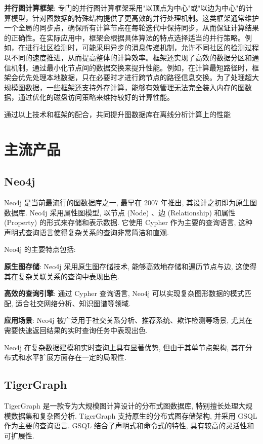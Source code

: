 \documentclass[12pt,hyperref,a4paper,UTF8]{ctexart}
\begin{document}
\textbf{并行图计算框架}: 专门的并行图计算框架采用"以顶点为中心"或"以边为中心"的计算模型，针对图数据的特殊结构提供了更高效的并行处理机制。这类框架通常维护一个全局的同步点，确保所有计算节点在每轮迭代中保持同步，从而保证计算结果的正确性。在实际应用中，框架会根据具体算法的特点选择适当的并行策略。例如，在进行社区检测时，可能采用异步的消息传递机制，允许不同社区的检测过程以不同的速度推进，从而提高整体的计算效率。框架还实现了高效的数据分区和通信机制，通过最小化节点间的数据交换来提升性能。例如，在计算最短路径时，框架会优先处理本地数据，只在必要时才进行跨节点的路径信息交换。为了处理超大规模图数据，一些框架还支持外存计算，能够有效管理无法完全装入内存的图数据，通过优化的磁盘访问策略来维持较好的计算性能。

通过以上技术和框架的配合，共同提升图数据库在离线分析计算上的性能
\section{主流产品}

\subsection{Neo4j}

Neo4j 是当前最流行的图数据库之一, 最早在 2007 年推出, 其设计之初即为原生图数据库. Neo4j 采用属性图模型, 以节点 (Node) 、边 (Relationship) 和属性 (Property) 的形式来存储和表示数据. 它使用 Cypher 作为主要的查询语言, 这种声明式查询语言使得复杂关系的查询非常简洁和直观.

Neo4j 的主要特点包括:

\textbf{原生图存储}: Neo4j 采用原生图存储技术, 能够高效地存储和遍历节点与边, 这使得其在复杂关联关系的查询中表现出色.

\textbf{高效的查询引擎}: 通过 Cypher 查询语言, Neo4j 可以实现复杂图形数据的模式匹配, 适合社交网络分析、知识图谱等领域.

\textbf{应用场景}: Neo4j 被广泛用于社交关系分析、推荐系统、欺诈检测等场景, 尤其在需要快速返回结果的实时查询任务中表现出色.

Neo4j 在复杂数据建模和实时查询上具有显著优势, 但由于其单节点架构, 其在分布式和水平扩展方面存在一定的局限性.

\subsection{TigerGraph}

TigerGraph 是一款专为大规模图计算设计的分布式图数据库, 特别擅长处理大规模数据集和复杂图分析. TigerGraph 支持原生的分布式图存储架构, 并采用 GSQL 作为主要的查询语言. GSQL 结合了声明式和命令式的特性, 具有较高的灵活性和可扩展性.
\end{document}

